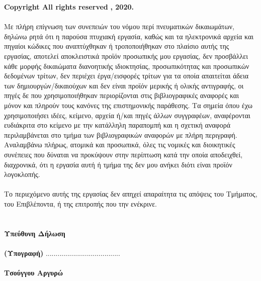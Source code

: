 \vspace{2.5cm}
{\bf \lt Copyright \textcopyright  All rights reserved} {\bf {}, 2020.}
\\
\vspace{0.5cm}
\\
{ Με πλήρη επίγνωση των συνεπειών του νόμου περί πνευματικών δικαιωμάτων, δηλώνω ρητά ότι η παρούσα πτυχιακή εργασία, καθώς και τα ηλεκτρονικά αρχεία και πηγαίοι κώδικες που αναπτύχθηκαν ή τροποποιήθηκαν στο πλαίσιο αυτής της εργασίας, αποτελεί αποκλειστικά προϊόν προσωπικής μου εργασίας, δεν προσβάλλει κάθε μορφής δικαιώματα διανοητικής ιδιοκτησίας, προσωπικότητας και προσωπικών δεδομένων τρίτων, δεν περιέχει έργα/εισφορές τρίτων για τα οποία απαιτείται άδεια των δημιουργών/δικαιούχων και δεν είναι προϊόν μερικής ή ολικής αντιγραφής, οι πηγές δε που χρησιμοποιήθηκαν περιορίζονται στις βιβλιογραφικές αναφορές και μόνον και πληρούν τους κανόνες της επιστημονικής παράθεσης. Τα σημεία όπου έχω χρησιμοποιήσει ιδέες, κείμενο, αρχεία ή/και πηγές άλλων συγγραφέων, αναφέρονται ευδιάκριτα στο κείμενο με την κατάλληλη παραπομπή και η σχετική αναφορά περιλαμβάνεται στο τμήμα των βιβλιογραφικών αναφορών με πλήρη περιγραφή. Αναλαμβάνω πλήρως, ατομικά και προσωπικά, όλες τις νομικές και διοικητικές συνέπειες που δύναται να προκύψουν στην περίπτωση κατά την οποία αποδειχθεί, διαχρονικά, ότι η εργασία αυτή ή τμήμα της δεν μου ανήκει διότι είναι προϊόν λογοκλοπής.}
\\
\vspace{0.5cm}
\\
{ Το περιεχόμενο αυτής της εργασίας δεν απηχεί απαραίτητα τις απόψεις του Τμήματος, του
Επιβλέποντα, ή της επιτροπής που την ενέκρινε.}
\\
\vspace{0.5cm}
\\
\\
{\bfseries Υπεύθυνη Δήλωση}
\\ \\
{\bfseries (Υπογραφή)}
......................................
\ \\\\
{ \bfseries Τσούγγου Αργυρώ}